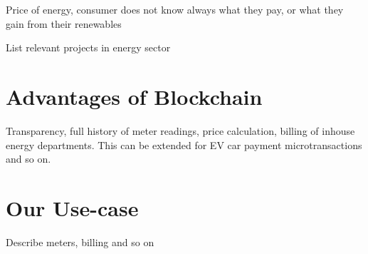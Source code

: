 Price of energy, consumer does not know always what they pay, or what they gain from their renewables

List relevant projects in energy sector


\section{Advantages of Blockchain}
Transparency, full history of meter readings, price calculation, billing of inhouse energy departments. This can be extended for EV car payment microtransactions and so on.

\section{Our Use-case}
Describe meters, billing and so on